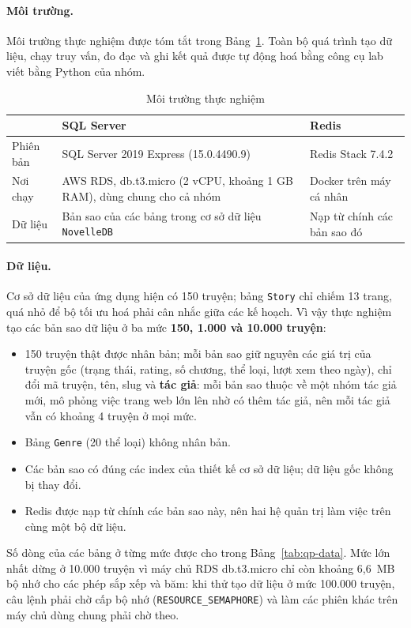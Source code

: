 \paragraph{Môi trường.}
Môi trường thực nghiệm được tóm tắt trong Bảng~\ref{tab:qp-env}. Toàn bộ quá trình tạo dữ liệu, chạy truy vấn, đo đạc và ghi kết quả được tự động hoá bằng công cụ lab viết bằng Python của nhóm.

\begin{table}[H]
    \centering
    \caption{Môi trường thực nghiệm}
    \label{tab:qp-env}
    \begin{tabularx}{\textwidth}{>{\raggedright\arraybackslash}p{3.2cm} X X}
        \toprule
        & \textbf{SQL Server} & \textbf{Redis} \\
        \midrule
        Phiên bản & SQL Server 2019 Express (15.0.4490.9) & Redis Stack 7.4.2 \\
        Nơi chạy & AWS RDS, db.t3.micro (2 vCPU, khoảng 1 GB RAM), dùng chung cho cả nhóm & Docker trên máy cá nhân \\
        Dữ liệu & Bản sao của các bảng trong cơ sở dữ liệu \texttt{NovelleDB} & Nạp từ chính các bản sao đó \\
        \bottomrule
    \end{tabularx}
\end{table}

\paragraph{Dữ liệu.}
Cơ sở dữ liệu của ứng dụng hiện có 150 truyện; bảng \texttt{Story} chỉ chiếm 13 trang, quá nhỏ để bộ tối ưu hoá phải cân nhắc giữa các kế hoạch. Vì vậy thực nghiệm tạo các bản sao dữ liệu ở ba mức \textbf{150, 1.000 và 10.000 truyện}:
\begin{itemize}
    \item 150 truyện thật được nhân bản; mỗi bản sao giữ nguyên các giá trị của truyện gốc (trạng thái, rating, số chương, thể loại, lượt xem theo ngày), chỉ đổi mã truyện, tên, slug và \textbf{tác giả}: mỗi bản sao thuộc về một nhóm tác giả mới, mô phỏng việc trang web lớn lên nhờ có thêm tác giả, nên mỗi tác giả vẫn có khoảng 4 truyện ở mọi mức.
    \item Bảng \texttt{Genre} (20 thể loại) không nhân bản.
    \item Các bản sao có đúng các index của thiết kế cơ sở dữ liệu; dữ liệu gốc không bị thay đổi.
    \item Redis được nạp từ chính các bản sao này, nên hai hệ quản trị làm việc trên cùng một bộ dữ liệu.
\end{itemize}
Số dòng của các bảng ở từng mức được cho trong Bảng~\ref{tab:qp-data}. Mức lớn nhất dừng ở 10.000 truyện vì máy chủ RDS db.t3.micro chỉ còn khoảng 6,6~MB bộ nhớ cho các phép sắp xếp và băm: khi thử tạo dữ liệu ở mức 100.000 truyện, câu lệnh phải chờ cấp bộ nhớ (\texttt{RESOURCE\_SEMAPHORE}) và làm các phiên khác trên máy chủ dùng chung phải chờ theo.

